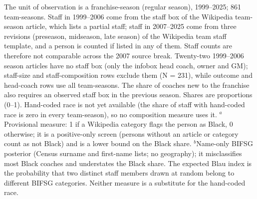 \begin{table}[!h]
\begin{threeparttable}
\begin{tablenotes}[para]
\item The unit of observation is a franchise-season (regular season), 1999--2025; 861 team-seasons. Staff in 1999--2006 come from the staff box of the Wikipedia team-season article, which lists a partial staff; staff in 2007--2025 come from three revisions (preseason, midseason, late season) of the Wikipedia team staff template, and a person is counted if listed in any of them. Staff counts are therefore not comparable across the 2007 source break. Twenty-two 1999--2006 season articles have no staff box (only the infobox head coach, owner and GM); staff-size and staff-composition rows exclude them (N = 231), while outcome and head-coach rows use all team-seasons. The share of coaches new to the franchise also requires an observed staff box in the previous season. Shares are proportions (0--1). Hand-coded race is not yet available (the share of staff with hand-coded race is zero in every team-season), so no composition measure uses it. $^a$Provisional measure: 1 if a Wikipedia category flags the person as Black, 0 otherwise; it is a positive-only screen (persons without an article or category count as not Black) and is a lower bound on the Black share. $^b$Name-only BIFSG posterior (Census surname and first-name lists; no geography); it misclassifies most Black coaches and understates the Black share. The expected Blau index is the probability that two distinct staff members drawn at random belong to different BIFSG categories. Neither measure is a substitute for the hand-coded race.
\end{tablenotes}
\end{threeparttable}
\end{table}
